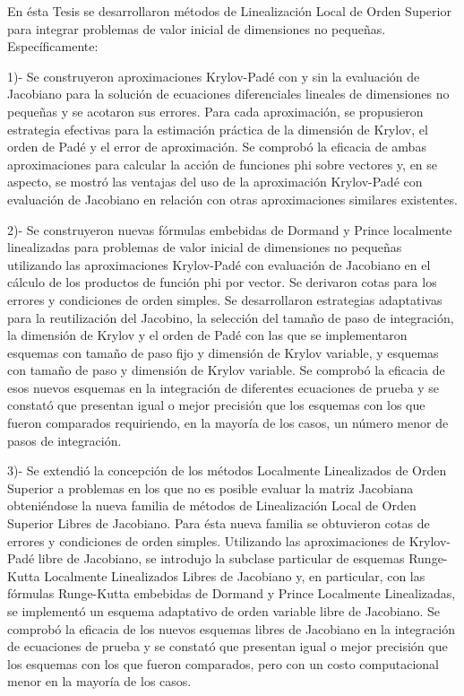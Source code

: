 \begin{conclusions}

    En ésta Tesis se desarrollaron métodos de Linealización Local de Orden Superior para integrar problemas de valor
    inicial de dimensiones no pequeñas. Específicamente:


    1)- Se construyeron aproximaciones Krylov-Padé con y sin la evaluación de Jacobiano para la solución de ecuaciones diferenciales lineales de dimensiones no pequeñas y se acotaron sus errores. Para cada aproximación, se propusieron estrategia efectivas para la estimación práctica de la dimensión de Krylov, el orden de Padé y el error de aproximación. Se comprobó la eficacia de ambas aproximaciones para calcular la acción de funciones phi sobre vectores y, en se aspecto, se mostró las ventajas del uso de la aproximación Krylov-Padé con evaluación de Jacobiano en relación con otras aproximaciones similares existentes.


    2)- Se construyeron nuevas fórmulas embebidas de Dormand y Prince localmente linealizadas para problemas de valor inicial de dimensiones no pequeñas utilizando las aproximaciones Krylov-Padé con evaluación de Jacobiano en el cálculo de los productos de función phi por vector. Se derivaron cotas para los errores y condiciones de orden simples. Se  desarrollaron estrategias adaptativas para la reutilización del Jacobino, la selección del tamaño de paso de integración, la dimensión de Krylov y el orden de Padé con las que se implementaron esquemas con tamaño de paso fijo y dimensión de Krylov variable, y esquemas con tamaño de paso y dimensión de Krylov variable. Se comprobó la eficacia de esos nuevos esquemas en la integración de diferentes ecuaciones de prueba y se constató que presentan igual o mejor precisión que los esquemas con los que fueron comparados requiriendo, en la mayoría de los casos, un número menor de pasos de integración.


    3)- Se extendió la concepción de los métodos Localmente Linealizados de Orden Superior a problemas en los que no es posible evaluar la matriz Jacobiana obteniéndose la nueva familia de métodos de  Linealización Local de Orden Superior Libres de Jacobiano. Para ésta nueva familia se obtuvieron cotas de errores y condiciones de orden simples. Utilizando las aproximaciones de Krylov-Padé libre de Jacobiano, se introdujo la subclase particular de esquemas Runge-Kutta Localmente Linealizados Libres de Jacobiano y, en particular, con las fórmulas Runge-Kutta embebidas de Dormand y  Prince Localmente Linealizadas, se implementó un esquema adaptativo de orden variable libre de Jacobiano. Se comprobó la eficacia de los nuevos esquemas libres de Jacobiano en la integración de ecuaciones de prueba y se constató que presentan igual o mejor precisión que los esquemas con los que fueron comparados, pero con un costo computacional menor en la mayoría de los casos. 




\end{conclusions}

